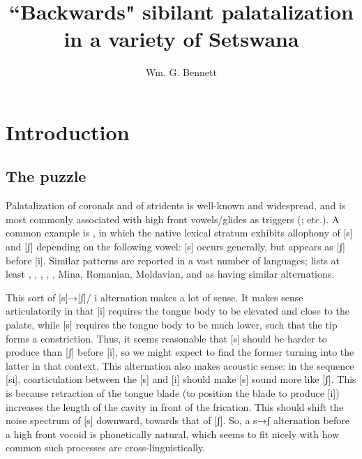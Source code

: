 \documentclass[output=paper,newtxmath,modfonts,nonflat]{langsci/langscibook}
\author{Wm. G. Bennett\affiliation{University of Calgary and Rhodes University}}
\title{``Backwards" sibilant palatalization in a variety of Setswana}
\begin{document}
\maketitle
\section{Introduction}\label{sec:bennett:1}
\subsection{The puzzle}\label{sec:bennett:1.1}



Palatalization of coronals and of stridents is well-known and widespread, and is most commonly associated with high front vowels/glides as triggers (\citealt{Bateman:2007aa,Bateman2010,Kochetov2011}; etc.). A common example is , in which the native lexical stratum exhibits allophony of [s] and [ʃ] depending on the following vowel: [s] occurs generally, but appears as [ʃ] before [i]. Similar patterns are reported in a vast number of languages; \citet{Bateman:2007aa} lists at least , , ,  , , Mina, Romanian, Moldavian, and  as having similar alternations. 

This sort of [s]→[ʃ]/ {\longrule} i alternation makes a lot of sense. It makes sense articulatorily in that [i] requires the tongue body to be elevated and close to the palate, while [s] requires the tongue body to be much lower, such that the tip forms a constriction. Thus, it seems reasonable that [s] should be harder to produce than [ʃ] before [i], so we might expect to find the former turning into the latter in that context. This alternation also makes acoustic sense: in the sequence [si], coarticulation between the [s] and [i] should make [s] sound more like [ʃ]. This is because retraction of the tongue blade (to position the blade to produce [i]) increases the length of the cavity in front of the frication. This should shift the noise spectrum of [s] downward, towards that of [ʃ]. So, a s→ʃ alternation before a high front vocoid is phonetically natural, which seems to fit nicely with how common such processes are cross-linguistically.
\end{document}

